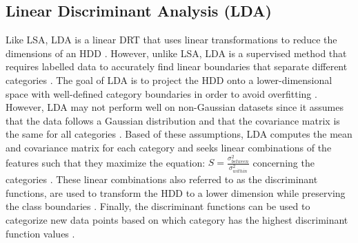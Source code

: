 \documentclass[12pt]{article}
\begin{document}
\subsection{Linear Discriminant Analysis (LDA)}
\hspace{\parindent} Like LSA, LDA is a linear DRT that uses linear transformations to reduce the dimensions of an HDD \parencite{ayesha_hanif_talib_2020}. However, unlike LSA, LDA is a supervised method that requires labelled data to accurately find linear boundaries that separate different categories \parencite{ayesha_hanif_talib_2020}. The goal of LDA is to project the HDD onto a lower-dimensional space with well-defined category boundaries in order to avoid overfitting \parencite{raschka_2014}. However, LDA may not perform well on non-Gaussian datasets since it assumes that the data follows a Gaussian distribution and that the covariance matrix is the same for all categories \parencite{raschka_2014}. Based of these assumptions, LDA computes the mean and covariance matrix for each category and seeks linear combinations of the features such that they maximize the equation: $S = \frac{\sigma^{2}_{between}}{\sigma^{2}_{within}}$ concerning the categories \parencite{raschka_2014}. These linear combinations also referred to as the discriminant functions, are used to transform the HDD to a lower dimension while preserving the class boundaries \parencite{raschka_2014}. Finally, the discriminant functions can be used to categorize new data points based on which category has the highest discriminant function values \parencite{raschka_2014}.
\end{document}
